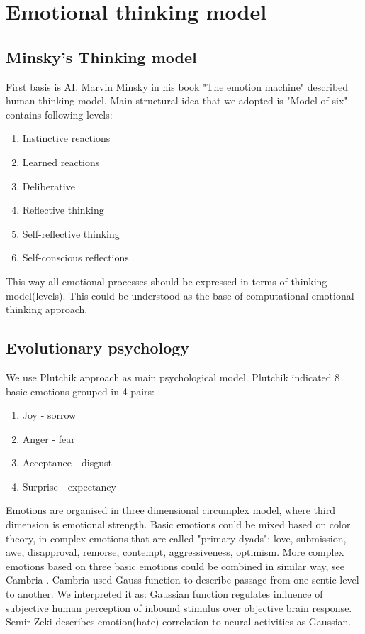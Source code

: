 \section{Emotional thinking model}

\subsection{Minsky's Thinking model}

First basis is  AI. Marvin Minsky in his book "The emotion machine" \cite{emotionmachine} described human thinking model. Main structural idea that we adopted is "Model of six" contains following levels: 
\begin{enumerate}
\item  Instinctive reactions
\item  Learned reactions
\item  Deliberative
\item  Reflective thinking
\item  Self-reflective thinking
\item  Self-conscious reflections
\end{enumerate}

This way all emotional processes should be expressed in terms of thinking model(levels). This could be understood as the base of computational emotional thinking approach.

\subsection{Evolutionary psychology}

We use Plutchik approach \cite{natureofemotions} as main psychological model. Plutchik indicated 8 basic emotions grouped in 4 pairs:

\begin{enumerate}
\item  Joy - sorrow
\item  Anger - fear
\item  Acceptance - disgust
\item  Surprise - expectancy
\end{enumerate}

Emotions are organised in three dimensional circumplex model, where third dimension is emotional strength. Basic emotions could be mixed based on color theory, in complex emotions that are called "primary dyads": love, submission, awe, disapproval, remorse, contempt, aggressiveness, optimism. More complex emotions based on three basic emotions could be combined in similar way, see Cambria \cite{senticcomputing}. Cambria \cite{hourglass} used Gauss function to describe passage from one sentic level to another. We interpreted it as: Gaussian function regulates influence of subjective human perception of inbound stimulus over objective brain response. Semir Zeki \cite{neuralcorrelatesofhate} describes emotion(hate) correlation to neural activities as Gaussian.

